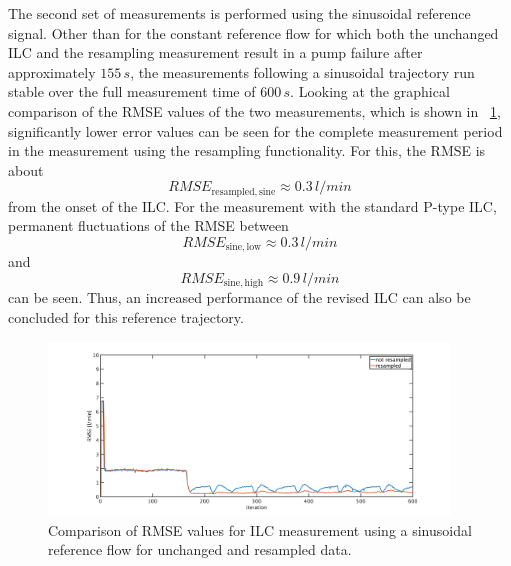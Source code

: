 The second set of measurements is performed using the sinusoidal reference signal. Other than for the constant reference flow for which both the unchanged ILC and the resampling measurement result in a pump failure after approximately $155\,s$, the measurements following a sinusoidal trajectory run stable over the full measurement time of $600\,s$.
Looking at the graphical comparison of the RMSE values of the two measurements, which is shown in \figurename~\ref{fig:RMSE_ilc_var_dist_comp_sine}, significantly lower error values can be seen for the complete measurement period in the measurement using the resampling functionality. For this, the RMSE is about
\begin{equation}
RMSE_{\mathrm{resampled,sine}}\approx0.3\,l/min
\end{equation}
from the onset of the ILC. For the measurement with the standard P-type ILC, permanent fluctuations of the RMSE between
\begin{equation}
 RMSE_{\mathrm{sine,low}}\approx0.3\,l/min
\end{equation}
and
\begin{equation}
 RMSE_{\mathrm{sine,high}}\approx0.9\,l/min
\end{equation}
can be seen.
Thus, an increased performance of the revised ILC can also be concluded for this reference trajectory.
\begin{figure}[ht!]
  \centering
  \includegraphics[width=0.95\textwidth]{images/chapt_5/ILC/RMSE_ilc_var_dist_comp_sine.pdf}
  \caption[Comparison of RMSE values for ILC measurement using a sinusoidal reference flow for unchanged and resampled data]{Comparison of RMSE values for ILC measurement using a sinusoidal reference flow for unchanged and resampled data.}
  \label{fig:RMSE_ilc_var_dist_comp_sine}
\end{figure}

